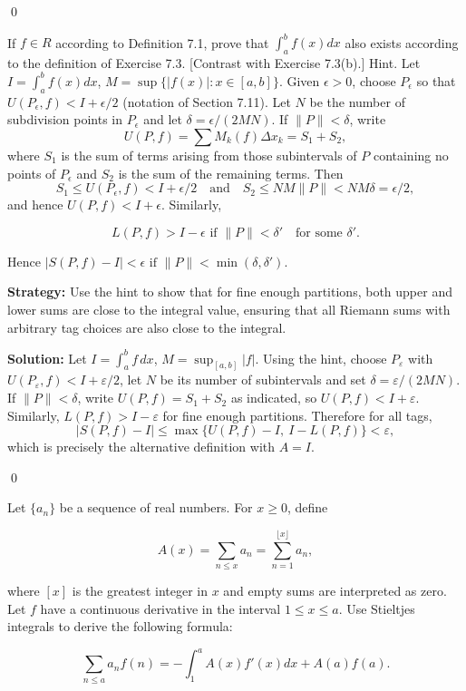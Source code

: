 \qed
\begin{problembox}
If $f \in R$ according to Definition 7.1, prove that $\int_a^b f(x) dx$ also exists according to the definition of Exercise 7.3. [Contrast with Exercise 7.3(b).] Hint. Let $I = \int_a^b f(x) dx$, $M = \sup \{ |f(x)| : x \in [a, b] \}$. Given $\epsilon > 0$, choose $P_\epsilon$ so that $U(P_\epsilon, f) < I + \epsilon/2$ (notation of Section 7.11). Let $N$ be the number of subdivision points in $P_\epsilon$ and let $\delta = \epsilon/(2MN)$. If $\|P\| < \delta$, write 
\[U(P, f) = \sum M_k(f) \Delta x_k = S_1 + S_2,\]
where $S_1$ is the sum of terms arising from those subintervals of $P$ containing no points of $P_\epsilon$ and $S_2$ is the sum of the remaining terms. Then
\[S_1 \leq U(P_\epsilon, f) < I + \epsilon/2 \quad \text{and} \quad S_2 \leq NM \|P\| < NM\delta = \epsilon/2,\]
and hence $U(P, f) < I + \epsilon$. Similarly,

\[ L(P, f) > I - \epsilon \text{ if } \|P\| < \delta' \quad \text{for some } \delta'. \]

Hence $|S(P, f) - I| < \epsilon \text{ if } \|P\| < \min (\delta, \delta')$.
\end{problembox}

\noindent\textbf{Strategy:} Use the hint to show that for fine enough partitions, both upper and lower sums are close to the integral value, ensuring that all Riemann sums with arbitrary tag choices are also close to the integral.

\bigskip\noindent\textbf{Solution:}
Let $I=\int_a^b f\,dx$, $M=\sup_{[a,b]}|f|$. Using the hint, choose $P_\varepsilon$ with $U(P_\varepsilon,f)<I+\varepsilon/2$, let $N$ be its number of subintervals and set $\delta=\varepsilon/(2MN)$. If $\|P\|<\delta$, write $U(P,f)=S_1+S_2$ as indicated, so $U(P,f)<I+\varepsilon$. Similarly, $L(P,f)>I-\varepsilon$ for fine enough partitions. Therefore for all tags,
\[|S(P,f)-I|\le \max\{U(P,f)-I,\ I-L(P,f)\}<\varepsilon,
\]
which is precisely the alternative definition with $A=I$.




\qed
\begin{problembox}
Let $\{a_n\}$ be a sequence of real numbers. For $x \geq 0$, define

\[ A(x) = \sum_{n \leq x} a_n = \sum_{n=1}^{\lfloor x \rfloor} a_n, \]

where $[x]$ is the greatest integer in $x$ and empty sums are interpreted as zero. Let $f$ have a continuous derivative in the interval $1 \leq x \leq a$. Use Stieltjes integrals to derive the following formula:

\[ \sum_{n \leq a} a_n f(n) = -\int_1^a A(x) f'(x) dx + A(a) f(a). \]
\end{problembox}

